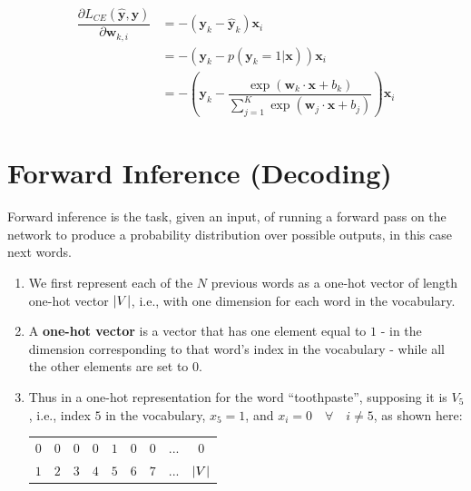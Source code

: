 \begin{align*}
    \dfrac{\partial L_{CE}(\mathbf{\hat{y}}, \mathbf{y})}{\partial \mathbf{w}_{k,i}} 
    &= -(\mathbf{y}_{k} - \mathbf{\hat{y}}_{k})\mathbf{x}_{i}\\
    &=-(\mathbf{y}_{k} - p(\mathbf{y}_{k}=1|\mathbf{x}))\mathbf{x}_{i}\\
    &=-\left(\mathbf{y}_{k} - \displaystyle\dfrac{\exp(\mathbf{w}_{k}\cdot \mathbf{x} + b_{k})}{\sum_{j=1}^{K} \exp(\mathbf{w}_{j}\cdot \mathbf{x} + b_{j})}\right)\mathbf{x}_i
\end{align*}

\section{Forward Inference (Decoding)}
Forward inference is the task, given an input, of running a forward pass on the network to produce a probability distribution over possible outputs, in this case next words.

\begin{enumerate}
    \item We first represent each of the $N$ previous words as a one-hot vector of length one-hot vector $\left| V \right|$, i.e., with one dimension for each word in the vocabulary.
    \item A \textbf{one-hot vector} is a vector that has one element equal to $1$ - in the dimension corresponding to that word’s index in the vocabulary - while all the other elements are set to $0$.
    \item Thus in a one-hot representation for the word “toothpaste”, supposing it is $V_5$, i.e., index $5$ in the vocabulary, $x_5 = 1$, and $x_i = 0 \quad\forall\quad i \neq 5$, as shown here:\\
    \begin{table}[h!]
        \centering
        \begin{tabular}{c c c c c c c c c}
            $0$ & $0$ & $0$ & $0$ & $1$ & $0$ & $0$ & ... & $0$\\
            $1$ & $2$ & $3$ & $4$ & $5$ & $6$ & $7$ & ... & $\left| V \right|$
        \end{tabular}
    \end{table}
\end{enumerate}

